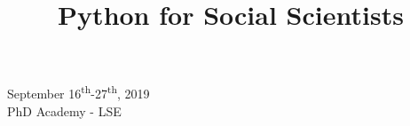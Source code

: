 \documentclass{article}
\numberwithin{equation}{section}
\begin{document}
\title{\Large Python for Social Scientists}




\date{\vspace{-1cm}}





\maketitle

\begin{center}
    September 16\textsuperscript{th}-27\textsuperscript{th}, 2019 \\
    PhD Academy - LSE
\end{center}

\vspace{1cm}


\end{document}
